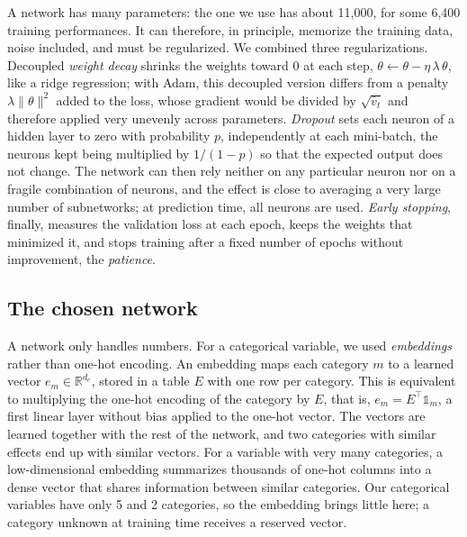 \documentclass[11pt,a4paper]{article}
\begin{document}
A network has many parameters: the one we use has about 11,000, for some 6,400 training performances. It can therefore,
in principle, memorize the training data, noise included, and must be regularized. We combined three regularizations.
Decoupled \emph{weight decay} \citep{loshchilov2019} shrinks the weights toward 0 at each step,
$\theta \leftarrow \theta - \eta\,\lambda\,\theta$, like a ridge regression; with Adam, this decoupled version differs
from a penalty $\lambda\lVert\theta\rVert^2$ added to the loss, whose gradient would be divided by $\sqrt{\hat v_t}$ and
therefore applied very unevenly across parameters. \emph{Dropout} \citep{srivastava2014} sets each neuron of a hidden
layer to zero with probability $p$, independently at each mini-batch, the neurons kept being multiplied by $1/(1 - p)$
so that the expected output does not change. The network can then rely neither on any particular neuron nor on a
fragile combination of neurons, and the effect is close to averaging a very large number of subnetworks; at prediction
time, all neurons are used. \emph{Early stopping}, finally, measures the validation loss at each epoch, keeps the
weights that minimized it, and stops training after a fixed number of epochs without improvement, the
\emph{patience}.

\subsection{The chosen network}\label{sec:architecture}

A network only handles numbers. For a categorical variable, we used \emph{embeddings} rather than one-hot encoding.
An embedding maps each category $m$ to a learned vector $e_m \in \mathbb{R}^{d_e}$, stored in a table $E$ with one row
per category. This is equivalent to multiplying the one-hot encoding of the category by $E$, that is,
$e_m = E^\top \mathbb 1_m$, a first linear layer without bias applied to the one-hot vector. The vectors are learned
together with the rest of the network, and two categories with similar effects end up with similar vectors. For a
variable with very many categories, a low-dimensional embedding summarizes thousands of one-hot columns into a dense
vector that shares information between similar categories. Our categorical variables have only 5 and 2 categories, so
the embedding brings little here; a category unknown at training time receives a reserved vector.
\end{document}
